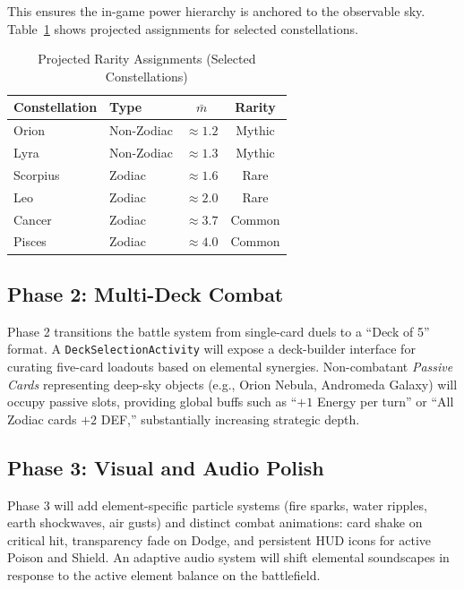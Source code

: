 \documentclass[conference]{IEEEtran}
\begin{document}
This ensures the in-game power hierarchy is anchored to the observable sky. Table~\ref{tab:rarity} shows projected assignments for selected constellations.

\begin{table}[htbp]
\caption{Projected Rarity Assignments (Selected Constellations)}
\label{tab:rarity}
\centering
\renewcommand{\arraystretch}{1.2}
\begin{tabular}{@{}llcc@{}}
\toprule
\textbf{Constellation} & \textbf{Type} & $\bar{m}$ & \textbf{Rarity} \\
\midrule
Orion        & Non-Zodiac & $\approx 1.2$ & Mythic  \\
Lyra         & Non-Zodiac & $\approx 1.3$ & Mythic  \\
Scorpius     & Zodiac     & $\approx 1.6$ & Rare    \\
Leo          & Zodiac     & $\approx 2.0$ & Rare    \\
Cancer       & Zodiac     & $\approx 3.7$ & Common  \\
Pisces       & Zodiac     & $\approx 4.0$ & Common  \\
\bottomrule
\end{tabular}
\end{table}

\subsection{Phase 2: Multi-Deck Combat}
Phase 2 transitions the battle system from single-card duels to a ``Deck of 5'' format. A \texttt{DeckSelectionActivity} will expose a deck-builder interface for curating five-card loadouts based on elemental synergies. Non-combatant \textit{Passive Cards} representing deep-sky objects (e.g., Orion Nebula, Andromeda Galaxy) will occupy passive slots, providing global buffs such as ``$+1$ Energy per turn'' or ``All Zodiac cards $+2$ DEF,'' substantially increasing strategic depth.

\subsection{Phase 3: Visual and Audio Polish}
Phase 3 will add element-specific particle systems (fire sparks, water ripples, earth shockwaves, air gusts) and distinct combat animations: card shake on critical hit, transparency fade on Dodge, and persistent HUD icons for active Poison and Shield. An adaptive audio system will shift elemental soundscapes in response to the active element balance on the battlefield.
\end{document}
